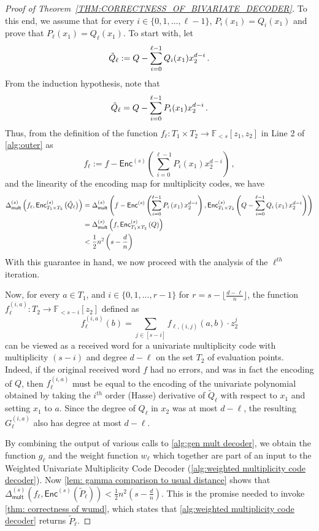 \documentclass{article}
\def\Field{\mathbb{F}}
\let\F\Field
\renewcommand{\tilde}[1]{\widetilde{#1}}
\newcommand{\enc}{{\mathsf{Enc}}}
\newcommand{\encs}{{\mathsf{Enc}^{(s)}}}
\newcommand{\Delm}{\Delta_{\mathsf{mult}}}
\begin{document}
\begin{proof}[Proof of Theorem~\ref{THM:CORRECTNESS_OF_BIVARIATE_DECODER}]
		To this end, we assume that for every $i \in \{0, 1, \ldots, \ell -1\}$, $P_i(x_1) = Q_i(x_1)$ and prove that $P_{\ell}(x_1) = Q_{\ell}(x_1)$. 
		To start with, let \[\Tilde{Q}_{\ell} := Q - \sum_{i = 0}^{\ell -1} Q_i(x_1)x_2^{d-i} \, .\] From the induction hypothesis, note that 
		\[\Tilde{Q}_{\ell} = Q - \sum_{i = 0}^{\ell -1} P_i(x_1)x_2^{d-i} \, .\]
		Thus, from the definition of the function $f_{\ell} \colon  T_1 \times
		T_2 \to \F_{<s}[z_1, z_2]$  in Line 2 of \cref{alg:outer}
		as \[f_{\ell} := f - \enc^{(s)}\left(\sum_{i = 0}^{\ell -1} P_i(x_1)x_2^{d-i}\right) \,
		,\] and the linearity of the encoding map for multiplicity codes, we have
		\begin{align*}
			\Delm^{(s)}\left(f_\ell, \enc^{(s)}_{T_1 \times T_2}\left(\Tilde{Q}_{\ell}\right)\right) &= \Delm^{(s)}\left(f - \enc^{(s)}\left(\sum_{i = 0}^{\ell -1} P_i\left(x_1\right)x_2^{d-i}\right),\enc^{(s)}_{T_1 \times T_2}\left(Q - \sum_{i = 0}^{\ell -1} Q_{i}\left(x_1\right)x_2^{d-i}\right)\right) \\
			&= \Delm^{(s)}\left(f,\enc^{(s)}_{T_1 \times T_2}\left(Q\right)\right) \\
			&< \frac{1}{2} n^2 \left(s-\frac{d}{n}\right) 
		\end{align*}
		With this guarantee in hand, we now proceed with the analysis of the $\ell^{th}$ iteration. 
		
		Now, for every $a \in T_1$, and $i \in \{0, 1, \ldots, r-1\}$ for $r = s - \lfloor \frac{d-\ell}{n} \rfloor$, the function $f_{\ell}^{(i, a)}\colon  T_2 \to \F_{<s-i}[z_2]$ defined as 
		\[
		f_{\ell}^{(i, a)} (b) = \sum_{j \in [s-i]} f_{\ell, (i, j)}(a, b) \cdot z_2^{j}
		\]
		can be viewed as a received word for a univariate multiplicity code
		with multiplicity $(s-i)$ and degree $d - \ell$ on the set $T_2$ of
		evaluation points. Indeed, if the original received word $f$ had no
		errors, and was in fact the encoding of $Q$, then $f_{\ell}^{(i, a)}$
		must be equal to the encoding of the univariate polynomial obtained by
		taking the $i^{th}$ order (Hasse) derivative of $\tilde{Q}_{\ell}$
		with respect to $x_1$ and setting $x_1$ to $a$. Since the degree of $Q_\ell$ in $x_2$ was at most $d-\ell$, the resulting  $G_{\ell}^{(i, a)}$ also has degree at most $d-\ell$.
		
		By combining the output of various calls to \cref{alg:gen mult decoder}, we obtain the function $g_{\ell}$ and the weight function $w_{\ell}$ which together are part of an input to the Weighted Univariate Multiplicity Code Decoder (\cref{alg:weighted multiplicity code decoder}). Now \cref{lem: gamma comparison to usual distance} shows that $\Delm^{(s)} \left(f_\ell, \encs\left( \tilde{P}_\ell\right)\right) < \frac{1}{2}n^2\left(s - \frac{d}{n}\right)$. This is the promise needed to invoke \cref{thm: correctness of wumd}, which states that \cref{alg:weighted multiplicity code decoder} returns $\tilde{P}_\ell$. 
		

\end{proof}
\end{document}
